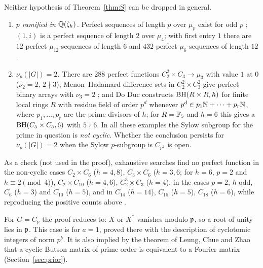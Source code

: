 \begin{remark}[Sharpness]\label{rem:S-sharp}
Neither hypothesis of Theorem~\ref{thm:S} can be dropped in general.
\begin{enumerate}[label=(\alph*),leftmargin=*]
\item \emph{$p$ ramified in $\mathbb{Q}(\zeta_h)$.} Perfect sequences of length
$p$ over $\mu_p$ exist for odd $p$ \cite{FrankZadoff1962,Chu1972};
$(1,i)$ is a perfect sequence of length $2$ over $\mu_4$; with first
entry $1$ there are $12$ perfect $\mu_{12}$-sequences of length $6$ and
$432$ perfect $\mu_6$-sequences of length $12$ .
\item \emph{$\nu_p(|G|)=2$.} There are $288$ perfect functions
$C_2^2\times C_3\to\mu_3$ with value $1$ at $0$ 
($\nu_2=2$, $2\nmid3$); Menon--Hadamard difference sets in
$C_2^2\times C_3^2$ give perfect binary arrays with $\nu_3=2$
\cite{Menon1962,DavisJedwab1996}; and Do Duc
\cite[Thm.~4.3]{DoDuc2019b} constructs $\operatorname{BH}(R\times R,h)$ for finite
local rings $R$ with residue field of order $p^d$ whenever
$p^d\in p_1\mathbb{N}+\dots+p_r\mathbb{N}$, where $p_1,\dots,p_r$ are the prime divisors
of $h$; for $R=\mathbb{F}_5$ and $h=6$ this gives a $\operatorname{BH}(C_5\times C_5,6)$ with
$5\nmid6$. In all these examples the Sylow subgroup for the prime in
question is \emph{not cyclic}. Whether the conclusion persists for
$\nu_p(|G|)=2$ when the Sylow $p$-subgroup is $C_{p^2}$ is open.
\end{enumerate}
As a check (not used in the proof), exhaustive searches find no perfect
function in the non-cyclic cases $C_2\times C_6$ ($h=4,8$),
$C_3\times C_6$ ($h=3,6$; for $h=6$, $p=2$ and $h\equiv2\pmod4$),
$C_2\times C_{10}$ ($h=4,6$), $C_2^3\times C_3$ ($h=4$), in the cases
$p=2$, $h$ odd, $C_6$ ($h=3$) and $C_{10}$ ($h=5$), and in $C_{14}$
($h=14$), $C_{15}$ ($h=5$), $C_{18}$ ($h=6$), while reproducing the
positive counts above .
\end{remark}

\begin{remark}[The case $H=1$]\label{rem:H1}
For $G=C_p$ the proof reduces to: $X$ or $X^*$ vanishes modulo $\mathfrak{p}$, so
a root of unity lies in $\mathfrak{p}$. This case is
\cite[Thm.~3.5]{DucSchmidt2019} for $a=1$, proved there with the
description of cyclotomic integers of norm $p^b$. It is also implied by
the theorem of Leung, Chue and Zhao \cite{LeungChueZhao2025} that a
cyclic Butson matrix of prime order is equivalent to a Fourier matrix
(Section~\ref{sec:prior}).
\end{remark}


